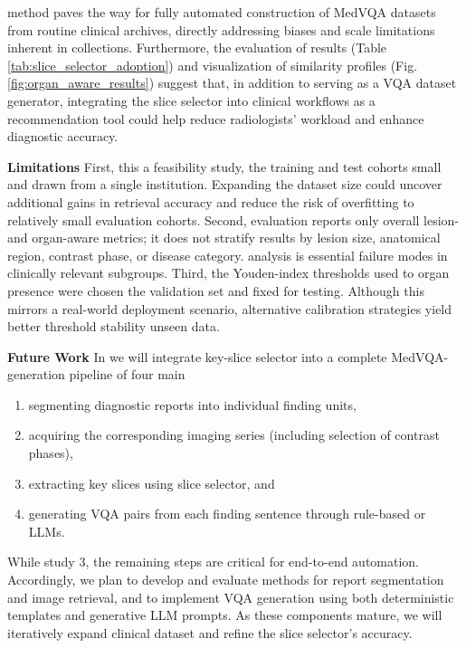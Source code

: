 \documentclass[bioengineering,article,submit,pdftex,moreauthors]{Definitions/mdpi}
\begin{document}
 method paves the way for fully automated construction of MedVQA datasets from routine clinical archives, directly addressing biases and scale limitations inherent in  collections. 
Furthermore, the  evaluation of  results (Table \ref{tab:slice_selector_adoption}) and visualization of similarity profiles (Fig. \ref{fig:organ_aware_results}) suggest that, in addition to serving as a VQA dataset generator, integrating the slice selector into clinical workflows as a recommendation tool could help reduce radiologists’ workload and enhance diagnostic accuracy. 


\textbf{Limitations}
First,  this  a feasibility study, the training and test cohorts  small and drawn from a single institution. Expanding the dataset size could uncover additional gains in retrieval accuracy and reduce the risk of overﬁtting to  relatively small evaluation cohorts. 
Second,  evaluation reports only overall lesion- and organ-aware metrics; it does not stratify results by lesion size, anatomical region, contrast phase, or disease category.  analysis is essential   failure modes in clinically relevant subgroups. 
Third, the Youden-index thresholds used to  organ presence were chosen  the validation set and fixed for testing. Although this mirrors a real-world deployment scenario, alternative calibration strategies  yield better threshold stability  unseen data. 


\textbf{Future Work}
In   we will integrate  key-slice selector into a complete MedVQA-generation pipeline  of four main  
\begin{enumerate}
  \item segmenting diagnostic reports into individual finding units, 
  \item acquiring the corresponding imaging series (including selection of contrast phases),
  \item extracting key slices using  slice selector, and 
  \item generating VQA pairs from each finding sentence through rule-based or LLMs.
\end{enumerate}
While  study   3, the remaining steps are critical for end-to-end automation.
Accordingly, we plan to develop and evaluate methods for report segmentation and image retrieval, and to implement VQA generation using both deterministic templates and generative LLM prompts. 
As these components mature, we will iteratively expand  clinical dataset and refine the slice selector’s accuracy. 
\end{document}
